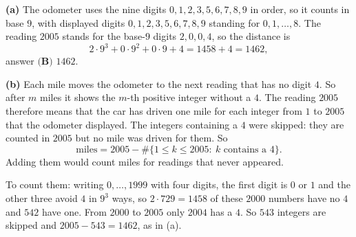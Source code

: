 \textbf{(a)} The odometer uses the nine digits $0,1,2,3,5,6,7,8,9$ in order, so it counts in base $9$, with displayed digits $0,1,2,3,5,6,7,8,9$ standing for $0,1,\dots,8$. The reading $2005$ stands for the base-$9$ digits $2,0,0,4$, so the distance is
\[2\cdot9^3+0\cdot9^2+0\cdot9+4=1458+4=1462,\]
answer $\boxed{\textbf{(B) } 1462}$.

\textbf{(b)} Each mile moves the odometer to the next reading that has no digit $4$. So after $m$ miles it shows the $m$-th positive integer without a $4$. The reading $2005$ therefore means that the car has driven one mile for each integer from $1$ to $2005$ that the odometer displayed. The integers containing a $4$ were skipped: they are counted in $2005$ but no mile was driven for them. So
\[\text{miles}=2005-\#\{1\le k\le2005:\ k\text{ contains a }4\}.\]
Adding them would count miles for readings that never appeared.

To count them: writing $0,\dots,1999$ with four digits, the first digit is $0$ or $1$ and the other three avoid $4$ in $9^3$ ways, so $2\cdot729=1458$ of these $2000$ numbers have no $4$ and $542$ have one. From $2000$ to $2005$ only $2004$ has a $4$. So $543$ integers are skipped and $2005-543=1462$, as in (a).

